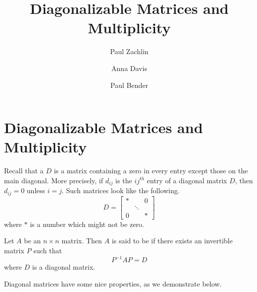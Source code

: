 \documentclass{ximera}
\author{Paul Zachlin \and Anna Davis \and Paul Bender} \title{Diagonalizable Matrices and Multiplicity} \license{CC-BY 4.0}
\begin{document}
\begin{abstract}
\end{abstract}
\maketitle

\section*{Diagonalizable Matrices and Multiplicity}
Recall that a  $D$ is a matrix containing a zero in every entry except those on the main diagonal.  More precisely, if $d_{ij}$ is the $ij^{th}$ entry of a diagonal matrix $D$, then
$d_{ij}=0$ unless $i=j$. Such
matrices look like the following.
\begin{equation*}
D = 
\begin{bmatrix}
* &  & 0 \\
& \ddots &  \\
0 &  & *
\end{bmatrix}
\end{equation*}
where $*$ is a number which might not be zero.


\begin{definition}\label{def:diagonalizable}
Let $A$ be an $n\times n$ matrix. Then $A$ is said to be  if there exists an invertible matrix $P$ such that
\begin{equation*}
P^{-1}AP=D
\end{equation*}
where $D$ is a diagonal matrix.
\end{definition}


Diagonal matrices have some nice properties, as we demonstrate below.
\end{document}
